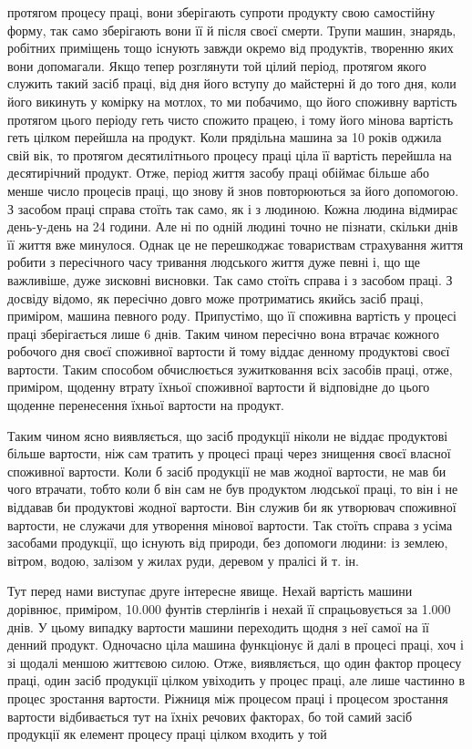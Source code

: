протягом процесу праці, вони зберігають супроти продукту свою
самостійну форму, так само зберігають вони її й після своєї смерти.
Трупи машин, знарядь, робітних приміщень тощо існують завжди
окремо від продуктів, творенню яких вони допомагали. Якщо
тепер розглянути той цілий період, протягом якого служить такий
засіб праці, від дня його вступу до майстерні й до того дня, коли
його викинуть у комірку на мотлох, то ми побачимо, що його
споживну вартість протягом цього періоду геть чисто спожито
працею, і тому його мінова вартість геть цілком перейшла на
продукт. Коли прядільна машина за 10 років оджила свій вік,
то протягом десятилітнього процесу праці ціла її вартість перейшла
на десятирічний продукт. Отже, період життя засобу праці
обіймає більше або менше число процесів праці, що знову й знов
повторюються за його допомогою. З засобом праці справа стоїть
так само, як і з людиною. Кожна людина відмирає день-у-день
на 24 години. Але ні по одній людині точно не пізнати, скільки
днів її життя вже минулося. Однак це не перешкоджає товариствам
страхування життя робити з пересічного часу тривання людського
життя дуже певні і, що ще важливіше, дуже зисковні висновки.
Так само стоїть справа і з засобом праці. З досвіду відомо, як
пересічно довго може протриматись якийсь засіб праці, приміром,
машина певного роду. Припустімо, що її споживна вартість у
процесі праці зберігається лише 6 днів. Таким чином пересічно
вона втрачає кожного робочого дня  своєї споживної вартости
й тому віддає денному продуктові  своєї вартости. Таким способом
обчислюється зужитковання всіх засобів праці, отже,
приміром, щоденну втрату їхньої споживної вартости й відповідне
до цього щоденне перенесення їхньої вартости на продукт.

Таким чином ясно виявляється, що засіб продукції ніколи не
віддає продуктові більше вартости, ніж сам тратить у процесі
праці через знищення своєї власної споживної вартости. Коли б
засіб продукції не мав жодної вартости, не мав би чого втрачати,
тобто коли б він сам не був продуктом людської праці, то він і
не віддавав би продуктові жодної вартости. Він служив би як
утворювач споживної вартости, не служачи для утворення мінової
вартости. Так стоїть справа з усіма засобами продукції, що
існують від природи, без допомоги людини: із землею, вітром,
водою, залізом у жилах руди, деревом у пралісі й т. ін.

Тут перед нами виступає друге інтересне явище. Нехай вартість
машини дорівнює, приміром, 10.000 фунтів стерлінґів
і нехай її спрацьовується за 1.000 днів. У цьому випадку  вартости
машини переходить щодня з неї самої на її денний продукт.
Одночасно ціла машина функціонує й далі в процесі праці, хоч
і зі щодалі меншою життєвою силою. Отже, виявляється, що
один фактор процесу праці, один засіб продукції цілком увіходить
у процес праці, але лише частинно в процес зростання вартости.
Ріжниця між процесом праці і процесом зростання вартости
відбивається тут на їхніх речових факторах, бо той самий
засіб продукції як елемент процесу праці цілком входить у той

